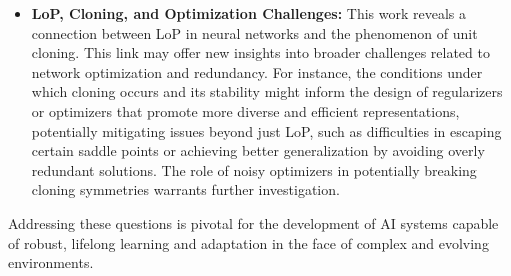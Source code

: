 \documentclass{article}
\begin{document}
\begin{itemize}[nosep]
    \item \textbf{LoP, Cloning, and Optimization Challenges:} This work reveals a connection between LoP in neural networks and the phenomenon of unit cloning. This link may offer new insights into broader challenges related to network optimization and redundancy. For instance, the conditions under which cloning occurs and its stability might inform the design of regularizers or optimizers that promote more diverse and efficient representations, potentially mitigating issues beyond just LoP, such as difficulties in escaping certain saddle points or achieving better generalization by avoiding overly redundant solutions. The role of noisy optimizers in potentially breaking cloning symmetries warrants further investigation.
\end{itemize}

Addressing these questions is pivotal for the development of AI systems capable of robust, lifelong learning and adaptation in the face of complex and evolving environments.

\end{document}
